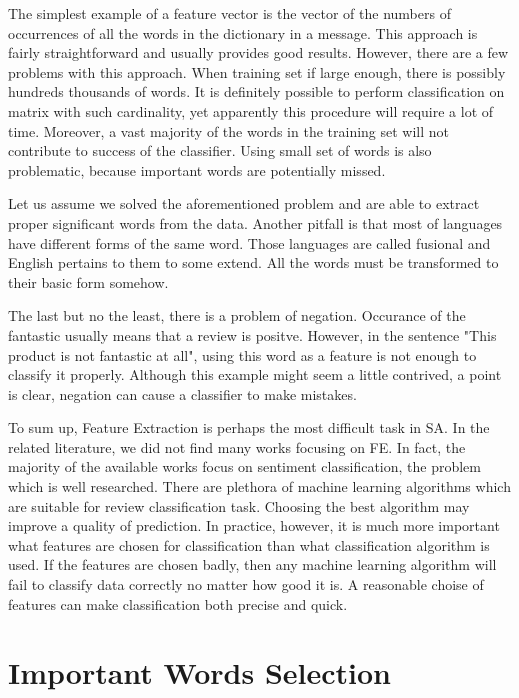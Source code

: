 \documentclass[12pt]{report}
\begin{document}
The simplest example of a feature vector is the vector of the numbers of occurrences of all the words in the dictionary in a message. This approach is fairly straightforward and usually provides good results. However, there are a few problems with this approach. When training set if large enough, there is possibly hundreds thousands of words. It is definitely possible to perform classification on matrix with such cardinality, yet apparently this procedure will require a lot of time. Moreover, a vast majority of the words in the training set will not contribute to success of the classifier. Using small set of words is also problematic, because important words are potentially missed.

Let us assume we solved the aforementioned problem and are able to extract proper significant words from the data. Another pitfall is that most of languages have different forms of the same word. Those languages are called fusional and English pertains to them to some extend. All the words must be transformed to their basic form somehow.

The last but no the least, there is a problem of negation. Occurance of the fantastic usually means that a review is positve. However, in the sentence "This product is not fantastic at all", using this word as a feature is not enough to classify it properly. Although this example might seem a little contrived, a point is clear, negation can cause a classifier to make mistakes.

To sum up, Feature Extraction is perhaps the most difficult task in SA. In
the related literature, we did not find many works focusing on FE. In fact, the
majority of the available works focus on sentiment classification, the problem which is well researched. There are plethora of machine learning algorithms which are suitable for review classification task. Choosing the best algorithm may improve a quality of prediction. In practice, however, it is much more important what features are chosen for classification than what classification algorithm is used. If the features are chosen badly, then any machine learning algorithm will fail to classify data correctly no matter how good it is. A reasonable choise of features can make classification both precise and quick.

\newpage

\section{Important Words Selection}
\end{document}
